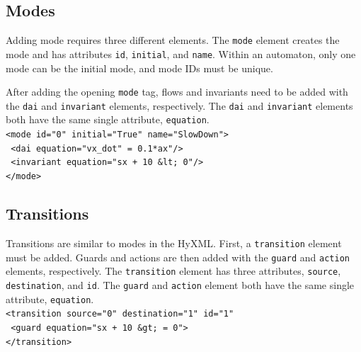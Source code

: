 \documentclass{tufte-book} %
\begin{document}
\subsection{Modes}
Adding mode requires three different elements. The \texttt{mode} element creates the mode and has attributes \texttt{id}, \texttt{initial}, and \texttt{name}. Within an automaton, only one mode can be the initial mode, and mode IDs must be unique.

After adding the opening \texttt{mode} tag, flows and invariants need to be added with the \texttt{dai} and \texttt{invariant} elements, respectively. The \texttt{dai} and \texttt{invariant} elements both have the same single attribute, \texttt{equation}.\\
\vspace{3mm}
\texttt{<mode id="0" initial="True" name="SlowDown">}\\
\texttt{  <dai equation="vx\_dot" = 0.1*ax"/>}\\
\texttt{  <invariant equation="sx + 10 \&lt; 0"/>}\\
\texttt{</mode>}

\subsection{Transitions}

Transitions are similar to modes in the HyXML. First, a \texttt{transition} element must be added. Guards and actions are then added with the \texttt{guard} and \texttt{action} elements, respectively. The \texttt{transition} element has three attributes, \texttt{source}, \texttt{destination}, and \texttt{id}. The \texttt{guard} and \texttt{action} element both have the same single attribute, \texttt{equation}.\\
\vspace{3mm}
\texttt{<transition source="0" destination="1" id="1"}\\
\texttt{  <guard equation="sx + 10 \&gt; = 0">}\\
\texttt{</transition>}
\end{document}
